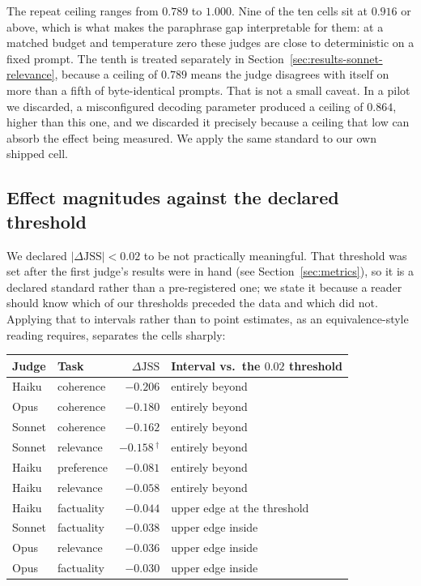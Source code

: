 The repeat ceiling ranges from $0.789$ to $1.000$. Nine of the ten cells sit at
$0.916$ or above, which is what makes the paraphrase gap interpretable for them:
at a matched budget and temperature zero these judges are close to deterministic
on a fixed prompt. The tenth is treated separately in
Section~\ref{sec:results-sonnet-relevance}, because a ceiling of $0.789$ means
the judge disagrees with itself on more than a fifth of byte-identical prompts.
That is not a small caveat. In a pilot we discarded, a misconfigured decoding
parameter produced a ceiling of $0.864$, higher than this one, and we discarded
it precisely because a ceiling that low can absorb the effect being measured. We apply the same standard to our own shipped cell.

\subsection{Effect magnitudes against the declared threshold}
\label{sec:results-sesoi}

We declared $|\Delta\mathrm{JSS}| < 0.02$ to be not practically meaningful. That
threshold was set after the first judge's results were in hand (see
Section~\ref{sec:metrics}), so it is a declared standard rather than a
pre-registered one; we state it because a reader should know which of our
thresholds preceded the data and which did not. Applying that to intervals rather than to point estimates, as an
equivalence-style reading requires, separates the cells sharply:

\begin{center}
\begin{tabular}{llrl}
\toprule
Judge & Task & $\Delta\mathrm{JSS}$ & Interval vs.\ the $0.02$ threshold \\
\midrule
Haiku  & coherence  & $-0.206$ & entirely beyond \\
Opus   & coherence  & $-0.180$ & entirely beyond \\
Sonnet & coherence  & $-0.162$ & entirely beyond \\
Sonnet & relevance  & $-0.158$\,$^{\dagger}$ & entirely beyond \\
Haiku  & preference & $-0.081$ & entirely beyond \\
Haiku  & relevance  & $-0.058$ & entirely beyond \\
\midrule
Haiku  & factuality & $-0.044$ & upper edge at the threshold \\
Sonnet & factuality & $-0.038$ & upper edge inside \\
Opus   & relevance  & $-0.036$ & upper edge inside \\
Opus   & factuality & $-0.030$ & upper edge inside \\
\bottomrule
\end{tabular}
\end{center}

